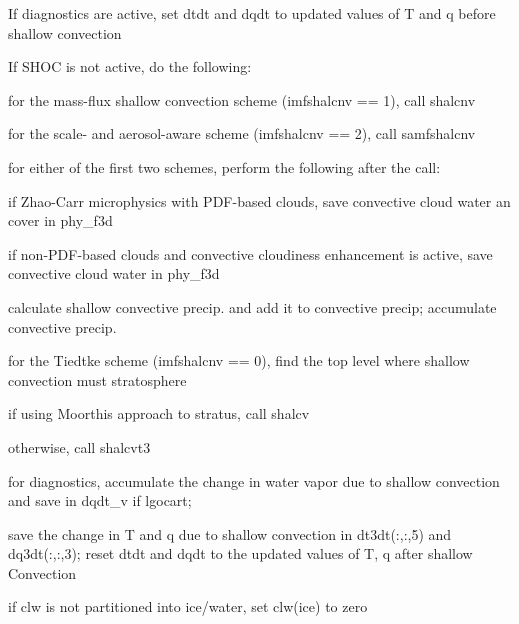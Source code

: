 \begin{DoxyItemize}
\item If diagnostics are active, set \textquotesingle{}dtdt\textquotesingle{} and \textquotesingle{}dqdt\textquotesingle{} to updated values of T and q before shallow convection
\item If S\+H\+OC is not active, do the following\+:
\begin{DoxyItemize}
\item for the mass-\/flux shallow convection scheme (imfshalcnv == 1), call \textquotesingle{}shalcnv\textquotesingle{}
\item for the scale-\/ and aerosol-\/aware scheme (imfshalcnv == 2), call \textquotesingle{}samfshalcnv\textquotesingle{}
\item for either of the first two schemes, perform the following after the call\+:
\begin{DoxyItemize}
\item if Zhao-\/\+Carr microphysics with P\+D\+F-\/based clouds, save convective cloud water an cover in \textquotesingle{}phy\+\_\+f3d\textquotesingle{}
\item if non-\/\+P\+D\+F-\/based clouds and convective cloudiness enhancement is active, save convective cloud water in \textquotesingle{}phy\+\_\+f3d\textquotesingle{}
\item calculate shallow convective precip. and add it to convective precip; accumulate convective precip.
\end{DoxyItemize}
\item for the Tiedtke scheme (imfshalcnv == 0), find the top level where shallow convection must stratosphere
\begin{DoxyItemize}
\item if using Moorthi\textquotesingle{}s approach to stratus, call \textquotesingle{}shalcv\textquotesingle{}
\item otherwise, call \textquotesingle{}shalcvt3\textquotesingle{}
\end{DoxyItemize}
\item for diagnostics, accumulate the change in water vapor due to shallow convection and save in dqdt\+\_\+v if \textquotesingle{}lgocart\textquotesingle{};
\begin{DoxyItemize}
\item save the change in T and q due to shallow convection in dt3dt(\+:,\+:,5) and dq3dt(\+:,\+:,3); reset dtdt and dqdt to the updated values of T, q after shallow Convection
\item if \textquotesingle{}clw\textquotesingle{} is not partitioned into ice/water, set \textquotesingle{}clw(ice)\textquotesingle{} to zero

\end{DoxyItemize}
\end{DoxyItemize}
\end{DoxyItemize}
